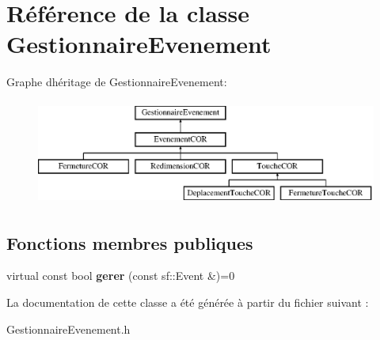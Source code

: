 \hypertarget{class_gestionnaire_evenement}{}\section{Référence de la classe Gestionnaire\+Evenement}
\label{class_gestionnaire_evenement}
Graphe d\textquotesingle{}héritage de Gestionnaire\+Evenement\+:\begin{figure}[H]
\begin{center}
\leavevmode
\includegraphics[height=3.456790cm]{class_gestionnaire_evenement}
\end{center}
\end{figure}
\subsection*{Fonctions membres publiques}
\begin{DoxyCompactItemize}
\item 
\mbox{\label{class_gestionnaire_evenement_af3dd4acdfe361172b7a30f3e9ac4b324}} 
virtual const bool {\bfseries gerer} (const sf\+::\+Event \&)=0
\end{DoxyCompactItemize}


La documentation de cette classe a été générée à partir du fichier suivant \+:\begin{DoxyCompactItemize}
\item 
Gestionnaire\+Evenement.\+h\end{DoxyCompactItemize}
